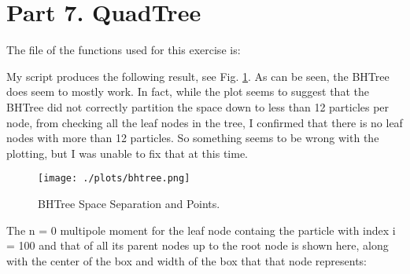 \section{Part 7. QuadTree}

The file of the functions used for this exercise is:



My script produces the following result, see Fig. \ref{fig:bhtree}. As can be seen, the BHTree does seem to mostly work.
In fact, while the plot seems to suggest that the BHTree did not correctly partition the space down to less than 12 particles
per node, from checking all the leaf nodes in the tree, I confirmed that there is no leaf nodes with more than 12 particles. So
something seems to be wrong with the plotting, but I was unable to fix that at this time.

\begin{figure}[h!]
  \centering
  \texttt{[image: ./plots/bhtree.png]}
  \caption{BHTree Space Separation and Points.}
  \label{fig:bhtree}
\end{figure}


The n = 0 multipole moment for the leaf node containg the particle with index i = 100 and that of
all its parent nodes up to the root node is shown here, along with the center of the box and width of the box that that
node represents:


